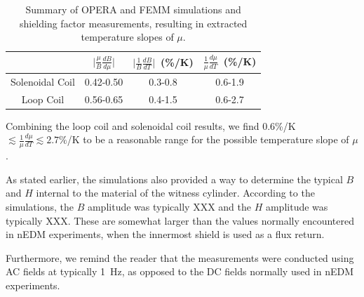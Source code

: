\begin{table}
\begin{tabular}{|c|c|c|c|}
\hline 
  & $\vert \frac{\mu}{B}\frac{dB}{d\mu}\vert$ & $\vert \frac{1}{B} \frac{dB}{dT}\vert$~(\%/K) & $\frac{1}{\mu}\frac{d\mu}{dT}$~(\%/K) \\ 
\hline 
Solenoidal Coil & 0.42-0.50 & 0.3-0.8 & 0.6-1.9 \\ 
\hline 
Loop Coil & 0.56-0.65 & 0.4-1.5 & 0.6-2.7 \\ 
\hline 
\end{tabular} 
\caption{Summary of OPERA and FEMM simulations and shielding factor
  measurements, resulting in extracted temperature slopes of $\mu$.}
\label{tab:axialsummary}

\end{table}


Combining the loop coil and solenoidal coil results, we find
0.6\%/K~$\lesssim\frac{1}{\mu}\frac{d\mu}{dT}\lesssim 2.7\%$/K to be a
reasonable range for the possible temperature slope of $\mu$.

As stated earlier, the simulations also provided a way to determine
the typical $B$ and $H$ internal to the material of the witness
cylinder.  According to the simulations, the $B$ amplitude was
typically XXX and the $H$ amplitude was typically XXX.  These are
somewhat larger than the values normally encountered in nEDM
experiments, when the innermost shield is used as a flux return.


Furthermore, we remind the reader that the measurements were conducted
using AC fields at typically 1~Hz, as opposed to the DC fields
normally used in nEDM experiments.



